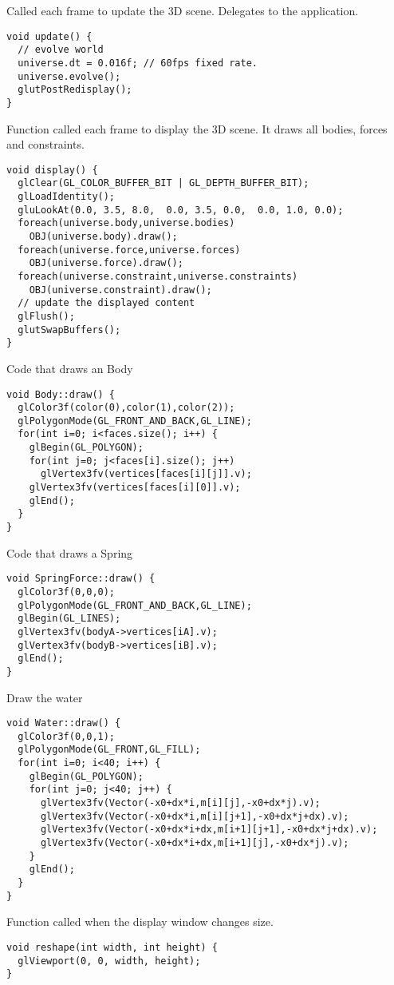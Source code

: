 Called each frame to update the 3D scene. Delegates to
the application.
\begin{lstlisting}
void update() {
  // evolve world
  universe.dt = 0.016f;	// 60fps fixed rate.
  universe.evolve();
  glutPostRedisplay();
}
\end{lstlisting}

Function called each frame to display the 3D scene.
It draws all bodies, forces and constraints.
\begin{lstlisting}
void display() {
  glClear(GL_COLOR_BUFFER_BIT | GL_DEPTH_BUFFER_BIT);
  glLoadIdentity();
  gluLookAt(0.0, 3.5, 8.0,  0.0, 3.5, 0.0,  0.0, 1.0, 0.0);
  foreach(universe.body,universe.bodies)
    OBJ(universe.body).draw();
  foreach(universe.force,universe.forces)
    OBJ(universe.force).draw();
  foreach(universe.constraint,universe.constraints)
    OBJ(universe.constraint).draw();
  // update the displayed content
  glFlush();
  glutSwapBuffers();
}
\end{lstlisting}

Code that draws an Body
\begin{lstlisting}
void Body::draw() {
  glColor3f(color(0),color(1),color(2));    
  glPolygonMode(GL_FRONT_AND_BACK,GL_LINE);
  for(int i=0; i<faces.size(); i++) {      
    glBegin(GL_POLYGON);
    for(int j=0; j<faces[i].size(); j++)
      glVertex3fv(vertices[faces[i][j]].v);
    glVertex3fv(vertices[faces[i][0]].v);
    glEnd();
  }
}
\end{lstlisting}

Code that draws a Spring
\begin{lstlisting}
void SpringForce::draw() {
  glColor3f(0,0,0);
  glPolygonMode(GL_FRONT_AND_BACK,GL_LINE);
  glBegin(GL_LINES);
  glVertex3fv(bodyA->vertices[iA].v);
  glVertex3fv(bodyB->vertices[iB].v);
  glEnd();
}
\end{lstlisting}

Draw the water
\begin{lstlisting}
void Water::draw() {
  glColor3f(0,0,1);
  glPolygonMode(GL_FRONT,GL_FILL);
  for(int i=0; i<40; i++) {
    glBegin(GL_POLYGON);
    for(int j=0; j<40; j++) {
      glVertex3fv(Vector(-x0+dx*i,m[i][j],-x0+dx*j).v);
      glVertex3fv(Vector(-x0+dx*i,m[i][j+1],-x0+dx*j+dx).v);
      glVertex3fv(Vector(-x0+dx*i+dx,m[i+1][j+1],-x0+dx*j+dx).v);
      glVertex3fv(Vector(-x0+dx*i+dx,m[i+1][j],-x0+dx*j).v);
    }
    glEnd();
  }      
}
\end{lstlisting}

Function called when the display window changes size.
\begin{lstlisting}
void reshape(int width, int height) {
  glViewport(0, 0, width, height);
}
\end{lstlisting}

